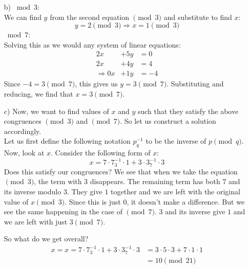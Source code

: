 \documentclass[]{article}
\begin{document}
\begin{qunlist}
{{\begin{enumerate}
\item[b)]
$\bmod 3$:\\
We can find $y$ from the second equation $\pmod 3$ and substitute to find $x$:
\[
y = 2 \pmod 3 \Rightarrow x = 1 \pmod 3
\]
$\bmod 7$:\\
Solving this as we would any system of linear equations:
\begin{align*}
2x &+ 5y &= 0 \\
2x &+ 4y &= 4 \\
\Rightarrow 0x &+ 1y &= -4
\end{align*}
Since $-4 = 3\pmod 7$, this gives us $y = 3\pmod 7$. Substituting and reducing, we find that $x = 3\pmod 7$.

\item[c)] Now, we want to find values of $x$ and $y$ such that they satisfy the above congruences $\pmod 3$ and $\pmod 7$. So let us construct a solution accordingly.
\\ Let us first define the following notation $p^{-1}_q$ to be the inverse of $p\pmod q$.
Now, look at $x$. Consider the following form of $x$:
\[
x = 7 \cdot 7^{-1}_3 \cdot 1 + 3 \cdot 3^{-1}_7 \cdot 3
\]
Does this satisfy our congruences? We see that when we take the equation $\pmod 3$, the term with 3 disappears. The remaining term has both $7$ and its inverse modulo $3$. They give $1$ together and we are left with the original value of $x\pmod 3$. Since this is just $0$, it doesn't make a difference. But we see the same happening in the case of $\pmod 7$. $3$ and its inverse give $1$ and we are left with just $3\pmod 7$.

So what do we get overall?
\begin{align*}
x = x = 7 \cdot 7^{-1}_3 \cdot 1 + 3 \cdot 3^{-1}_7 \cdot 3 &= 3 \cdot 5 \cdot 3 + 7 \cdot 1 \cdot 1 \\
&= 10 \pmod {21}
\end{align*}


\end{enumerate}}}
\end{qunlist}
\end{document}
